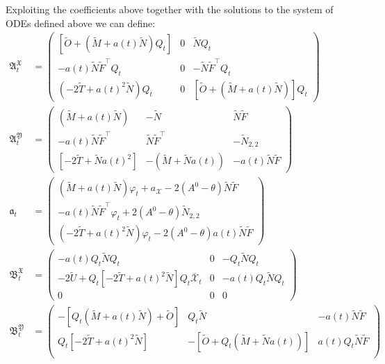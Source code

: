 \documentclass[11pt,twoside]{amsart}
\theoremstyle{definition}
\numberwithin{equation}{section}
\renewcommand{\bar}{\overline}
\renewcommand{\tilde}{\widetilde}
\begin{document}
Exploiting the coefficients above together with the solutions to the system of ODEs defined above we can define:
\begin{align*}
    \mathfrak{A}^{\mathfrak{X}}_t   &= 
    \begin{pmatrix}
        [\tilde{O} + (\tilde{M} + a(t)\tilde{N}) Q_t]   & 0 & \tilde{N}Q_t\\
        - a(t)\tilde{N}\tilde{F}^\top Q_t & 0 & - \tilde{N}\tilde{F}^\top Q_t \\ 
        (- 2\tilde{T} +a(t)^2 \tilde{N})Q_t  &0&[\tilde{O} + (\tilde{M} + a(t) \tilde{N})]Q_t 
    \end{pmatrix}\\
    \mathfrak{A}^{\mathfrak{Y}}_t   &=
    \begin{pmatrix}
        (\tilde{M} + a(t) \tilde{N})  & -\tilde{N} & \tilde{N}\tilde{F}\\
       - a(t)\tilde{N}\tilde{F}^\top & \tilde{N}\tilde{F}^\top & -\tilde{N}_{2,2}\\
        [-2\tilde{T} + \tilde{N}a(t)^2] &-(\widetilde{M} + \widetilde{N}a(t)) & -a(t)\tilde{N}\tilde{F}
    \end{pmatrix}\\
    \mathfrak{a}_t   &=
    \begin{pmatrix}
        (\tilde{M} + a(t) \tilde{N})\varphi_t + a_\mathcal{X}  - 2(A^0-\theta)\tilde{N}\tilde{F}\\
        - a(t) \tilde{N}\tilde{F}^\top \varphi_t +2(A^0-\theta)\tilde{N}_{2,2}\\
        (- 2\tilde{T} + a(t)^2\tilde{N})\varphi_t- 2(A^0-\theta)a(t) \tilde{N}\tilde{F}
    \end{pmatrix}\\
    \mathfrak{B}^{\mathfrak{X}}_t   &=
    \begin{pmatrix}
        - a(t) Q_t \widetilde{N} Q_t    & 0 & -  Q_t \widetilde{N} Q_t\\
     -2 \widetilde{U} +Q_t [-2\widetilde{T}+a(t)^2\widetilde{N}] Q_t \bar{\mathcal{X}}_t & 0 & - a(t)Q_t \widetilde{N} Q_t\\
     0 &0&0
    \end{pmatrix}\\
    \mathfrak{B}^{\mathfrak{Y}}_t   &=
    \begin{pmatrix}
      - [Q_t ( \widetilde{M} + a(t) \widetilde{N}) +\widetilde{O}] &  Q_t \widetilde{N} &- a(t)\tilde{N}\tilde{F}  \\
         Q_t[-2\widetilde{T}+a(t)^2\widetilde{N}] & - [\widetilde{O}+Q_t(\widetilde{M}+ \widetilde{N}a(t))] & a(t)Q_t\tilde{N}\tilde{F}\\

\end{pmatrix}
\end{align*}
\end{document}
